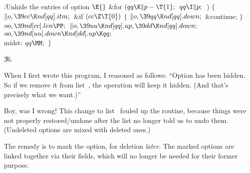 \B{}:Unhide the entries of option \X${}\E{}$\6
\&{for} ${}(\\{qq}\K\|p-\T{1};{}$ ${}\\{qq}\I\|p;{}$ \,)\5
${}\{{}$\1\6
${}\|o,\39\\{cc}\K\\{nd}[\\{qq}].\\{itm};{}$\6
\&{if} ${}(\\{cc}\Z\T{0}){}$\5
${}\{{}$\1\6
${}\|o,\39\\{qq}\K\\{nd}[\\{qq}].\\{down};{}$\6
\&{continue};\6
\4${}\}{}$\2\6
${}\\{oo},\39\\{nd}[\\{cc}].\\{len}\PP;{}$\6
${}\|o,\39\\{uu}\K\\{nd}[\\{qq}].\\{up},\39\\{dd}\K\\{nd}[\\{qq}].\\{down};{}$\6
${}\\{oo},\39\\{nd}[\\{uu}].\\{down}\K\\{nd}[\\{dd}].\\{up}\K\\{qq};{}$\6
\4\\{midst}:\5
${}\\{qq}\MM;{}$\6
\4${}\}{}$\2\par
\U36.\fi

When I first wrote this program, I reasoned as follows:
``Option  has been hidden. So if we remove it from list~, the
operation  will keep it hidden. (And that's precisely
what we want.)''

Boy, was I wrong! This change to list~ fouled up the 
routine,
because things were not properly restored/undone after the list no longer
told us to undo them. (Undeleted options are mixed with deleted ones.)

The remedy is to mark the option, for deletion {\it later}.
The marked options are linked together via their  fields, which
will no longer be needed for their former purpose.

